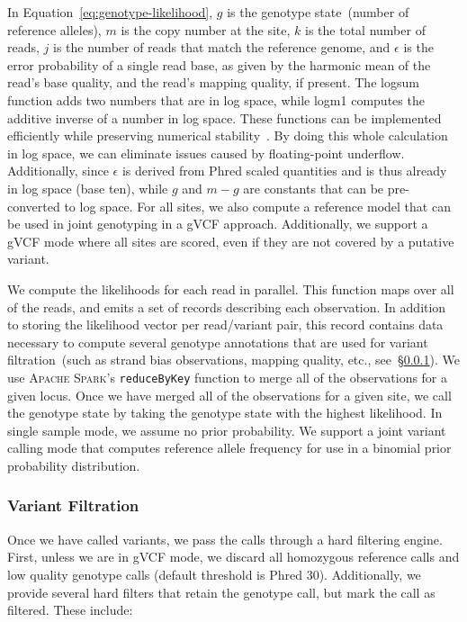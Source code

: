 \documentclass{bioinfo}
\begin{document}
\begin{methods}
In Equation~\eqref{eq:genotype-likelihood}, $g$ is the genotype state~(number of
reference alleles), $m$ is the copy number at the site, $k$ is the total number of
reads, $j$ is the number of reads that match the reference genome, and $\epsilon$
is the error probability of a single read base, as given by the harmonic mean of the
read's base quality, and the read's mapping quality, if present. The logsum function
adds two numbers that are in log space, while logm1 computes the additive inverse of
a number in log space. These functions can be implemented efficiently while preserving
numerical stability~\citep{durbin98}. By doing this whole calculation in log space,
we can eliminate issues caused by floating-point underflow. Additionally, since
$\epsilon$ is derived from Phred scaled quantities and is thus already in log
space (base ten), while $g$ and $m - g$ are constants that can be pre-converted to
log space. For all sites, we also compute a reference model that can be used in
joint genotyping in a gVCF approach. Additionally, we support a gVCF mode where all
sites are scored, even if they are not covered by a putative variant.

We compute the likelihoods for each read in parallel. This function maps over all
of the reads, and emits a set of records describing each observation. In addition
to storing the likelihood vector per read/variant pair, this record contains data
necessary to compute several genotype annotations that are used for variant
filtration~(such as strand bias observations, mapping quality, etc.,
see~\S\ref{sec:variant-filtration}). We use \textsc{Apache Spark}'s
\texttt{reduceByKey} function to merge all of the observations for a given
locus. Once we have merged all of the observations for a given site, we call the
genotype state by taking the genotype state with the highest likelihood. In single
sample mode, we assume no prior probability. We support a joint variant calling
mode that computes reference allele frequency for use in a binomial prior
probability distribution.

\subsubsection{Variant Filtration}
\label{sec:variant-filtration}

Once we have called variants, we pass the calls through a hard filtering engine.
First, unless we are in gVCF mode, we discard all homozygous reference calls and
low quality genotype calls (default threshold is Phred 30). Additionally, we
provide several hard filters that retain the genotype call, but mark the call as
filtered. These include:


\end{methods}
\end{document}
